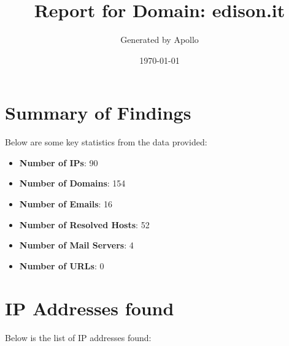 \documentclass{article}
\title{Report for Domain: edison.it}
\author{Generated by Apollo}
\date{\today}
\begin{document}
\maketitle
\clearpage

\tableofcontents  %

\clearpage

\section{Summary of Findings}

Below are some key statistics from the data provided:

\begin{itemize}
    \item \textbf{Number of IPs}: 90
    \item \textbf{Number of Domains}: 154
    \item \textbf{Number of Emails}: 16
    \item \textbf{Number of Resolved Hosts}: 52
    \item \textbf{Number of Mail Servers}: 4
    \item \textbf{Number of URLs}: 0
\end{itemize}

\clearpage

\section{IP Addresses found}

Below is the list of IP addresses found:
\end{document}
